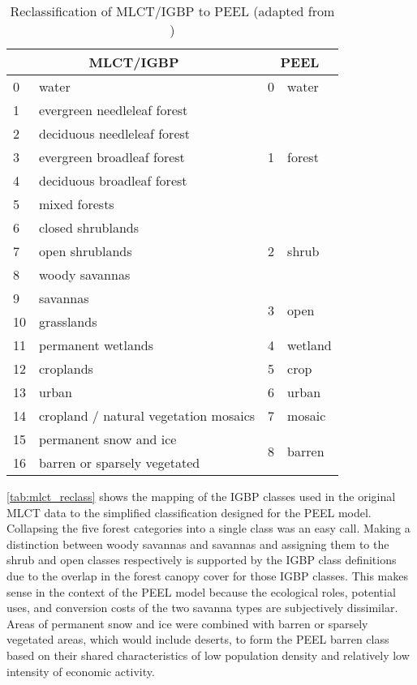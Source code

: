 \begin{table}[htbp]
  \begin{center}
    \begin{tabular}{|l|l|l|l|}
      \hline
      \multicolumn{2}{|c|}{MLCT/IGBP} & \multicolumn{2}{|c|}{PEEL} \\
      \hline
      0 & water & 0 & water \\
      \hline
      1 & evergreen needleleaf forest & \multirow{5}{*}{1} & \multirow{5}{*}{forest} \\
      2 & deciduous needleleaf forest & & \\
      3 & evergreen broadleaf forest & & \\
      4 & deciduous broadleaf forest & & \\
      5 & mixed forests & & \\
      \hline
      6 & closed shrublands & \multirow{3}{*}{2} & \multirow{3}{*}{shrub} \\
      7 & open shrublands & & \\
      8 & woody savannas & & \\
      \hline
      9 & savannas & \multirow{2}{*}{3} & \multirow{2}{*}{open} \\
      10 & grasslands & & \\
      \hline
      11 & permanent wetlands & 4 & wetland \\
      \hline
      12 & croplands & 5 & crop \\
      \hline
      13 & urban & 6 & urban \\
      \hline
      14 & cropland / natural vegetation mosaics & 7 & mosaic \\
      \hline
      15 & permanent snow and ice & \multirow{2}{*}{8} & \multirow{2}{*}{barren} \\
      16 & barren or sparsely vegetated & & \\  
      \hline
    \end{tabular}
    \caption{Reclassification of MLCT/IGBP to PEEL (adapted from \citet{Friedl2002})}
    \label{tab:mlct_reclass}
  \end{center}
\end{table}

\autoref{tab:mlct_reclass} shows the mapping of the IGBP classes used
in the original MLCT data to the simplified classification designed
for the PEEL model.  Collapsing the five forest categories into a
single class was an easy call.  Making a distinction between woody
savannas and savannas and assigning them to the shrub and open classes
respectively is supported by the IGBP class definitions
\citep{Friedl2002} due to the overlap in the forest canopy cover for
those IGBP classes.  This makes sense in the context of the PEEL model
because the ecological roles, potential uses, and conversion costs of
the two savanna types are subjectively dissimilar.  Areas of permanent
snow and ice were combined with barren or sparsely vegetated areas,
which would include deserts, to form the PEEL barren class based on
their shared characteristics of low population density and relatively
low intensity of economic activity.




